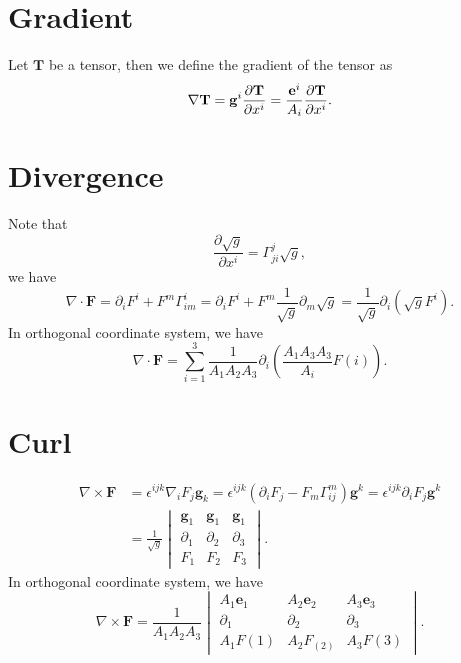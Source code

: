 \documentclass{article}
\theoremstyle{1}
\theoremstyle{2}
\newcommand{\pa}{\partial}
\begin{document}
\section{Gradient}
Let $\mathbf{T}$ be a tensor, then we define the gradient of the tensor as
\begin{equation}
    \nabla \mathbf{T}=\mathbf{g}^i\pdv{\mathbf{T}}{x^i}=\frac{\mathbf{e}^i}{A_i}\pdv{\mathbf{T}}{x^i}.
\end{equation}



\section{Divergence}
Note that 
\begin{equation}
    \frac{\pa \sqrt{g}}{\pa x^i}=\Gamma_{ji}^j\sqrt{g},
\end{equation}
we have 
\begin{equation}
    \nabla\cdot\mathbf{F}=\pa_i F^i+F^m\Gamma_{im}^i=\pa_i F^i+ F^m\frac{1}{\sqrt{g}}\pa _m\sqrt{g}=\frac{1}{\sqrt{g}}\pa_i\left(\sqrt{g}F^i\right).
\end{equation}
In orthogonal coordinate system, we have
\begin{equation}
    \nabla\cdot\mathbf{F}=\sum_{i=1}^3\frac{1}{A_1A_2A_3}\pa_i\left(\frac{A_1A_3A_3}{A_i}F(i)\right).
\end{equation}



\section{Curl}
\begin{align}
    \nabla\times \mathbf{F}&=\epsilon^{ijk}\nabla_i F_j\mathbf{g}_k=\epsilon^{ijk}\left(\pa_i F_j-F_m\Gamma_{ij}^m\right)\mathbf{g}^k=\epsilon^{ijk}\pa_iF_j\mathbf{g}^k\\
    &=\frac{1}{\sqrt{g}}\begin{vmatrix}
 \mathbf{g}_1  & \mathbf{g}_1 &\mathbf{g}_1 \\
 \partial _1 & \partial _2 &\partial _3 \\
 F_1 & F_2 &F_3
\end{vmatrix}.
\end{align}
In orthogonal coordinate system, we have
\begin{equation}
    \nabla\times \mathbf{F}=\frac{1}{A_1A_2A_3} \begin{vmatrix}
 A_1\mathbf{e}_1  & A_2\mathbf{e}_2 &A_3\mathbf{e}_3 \\
 \partial _1 & \partial _2 &\partial _3 \\
 A_1F(1) & A_2F_(2) &A_3F(3)
\end{vmatrix}.
\end{equation}
\end{document}
